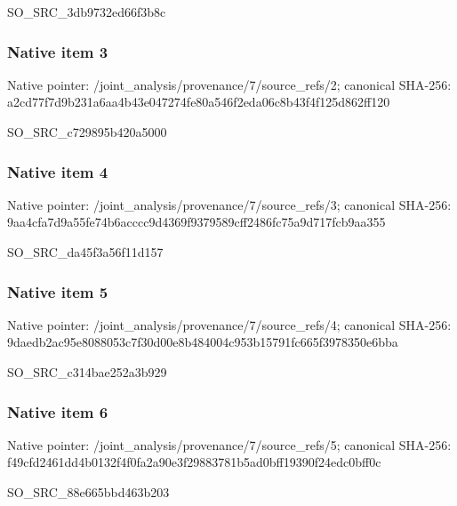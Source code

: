 \documentclass[10pt,a4paper]{article}
\begin{document}
\begingroup\raggedright\sloppy SO\_\allowbreak{}SRC\_\allowbreak{}3db9732ed66f3b8c\par\endgroup

\subsubsection{Native item 3}
Native pointer: /joint\_\allowbreak{}analysis/provenance/7/source\_\allowbreak{}refs/2; canonical SHA-256: a2cd77f7d9b231a6aa4b43e047274fe80a546f2eda06c8b43f4f125d862ff120

\begingroup\raggedright\sloppy SO\_\allowbreak{}SRC\_\allowbreak{}c729895b420a5000\par\endgroup

\subsubsection{Native item 4}
Native pointer: /joint\_\allowbreak{}analysis/provenance/7/source\_\allowbreak{}refs/3; canonical SHA-256: 9aa4cfa7d9a55fe74b6acccc9d4369f9379589cff2486fc75a9d717fcb9aa355

\begingroup\raggedright\sloppy SO\_\allowbreak{}SRC\_\allowbreak{}da45f3a56f11d157\par\endgroup

\subsubsection{Native item 5}
Native pointer: /joint\_\allowbreak{}analysis/provenance/7/source\_\allowbreak{}refs/4; canonical SHA-256: 9daedb2ac95e8088053c7f30d00e8b484004c953b15791fc665f3978350e6bba

\begingroup\raggedright\sloppy SO\_\allowbreak{}SRC\_\allowbreak{}c314bae252a3b929\par\endgroup

\subsubsection{Native item 6}
Native pointer: /joint\_\allowbreak{}analysis/provenance/7/source\_\allowbreak{}refs/5; canonical SHA-256: f49cfd2461dd4b0132f4f0fa2a90e3f29883781b5ad0bff19390f24edc0bff0c

\begingroup\raggedright\sloppy SO\_\allowbreak{}SRC\_\allowbreak{}88e665bbd463b203\par\endgroup
\end{document}
